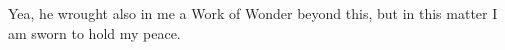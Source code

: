Yea, he wrought also in me a Work of Wonder beyond this, but in this matter I am sworn to hold my peace.
%
%
%
%
%
%
